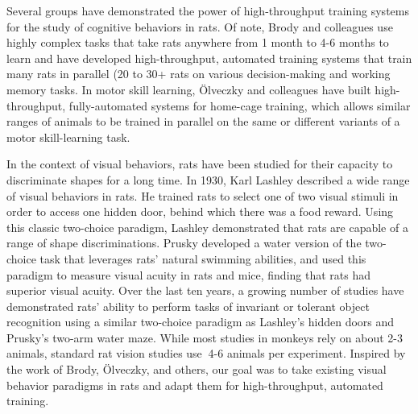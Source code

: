 Several groups have demonstrated the power of high-throughput training systems for the study of cognitive behaviors in rats. Of note, Brody and colleagues use highly complex tasks that take rats anywhere from 1 month to 4-6 months to learn\cite{Brunton2013, Miller2017TwoStep, Constantinople2019} and have developed high-throughput, automated training systems that train many rats in parallel (20 to 30+ rats\cite{Brunton2013, Constantinople2019} on various decision-making and working memory tasks\cite{Miller2017TwoStep, Brunton2013}. In motor skill learning, {\"O}lveczky and colleagues have built high-throughput, fully-automated systems for home-cage training, which allows similar ranges of animals to be trained in parallel on the same or different variants of a motor skill-learning task\cite{Poddar2013}. 

In the context of visual behaviors, rats have been studied for their capacity to discriminate shapes for a long time. In 1930, Karl Lashley\cite{Lashley1930} described a wide range of visual behaviors in rats. He trained rats to select one of two visual stimuli in order to access one hidden door, behind which there was a food reward\cite{Lashley1938}. Using this classic two-choice paradigm, Lashley demonstrated that rats are capable of a range of shape discriminations. Prusky developed a water version of the two-choice task that leverages rats' natural swimming abilities, and used this paradigm to measure visual acuity in rats and mice, finding that rats had superior visual acuity\cite{Prusky2000}. Over the last ten years, a growing number of studies have demonstrated rats' ability to perform tasks of invariant or tolerant object recognition using a similar two-choice paradigm as Lashley's hidden doors and Prusky's two-arm water maze\cite{Zoccolan2009, Vermaercke2012, Tafazoli2012, Alemi-Neissi2013, Djurdjevic2018}. While most studies in monkeys rely on about 2-3 animals, standard rat vision studies use $~$4-6 animals per experiment. Inspired by the work of Brody, {\"O}lveczky, and others, our goal was to take existing visual behavior paradigms in rats and adapt them for high-throughput, automated training. 


